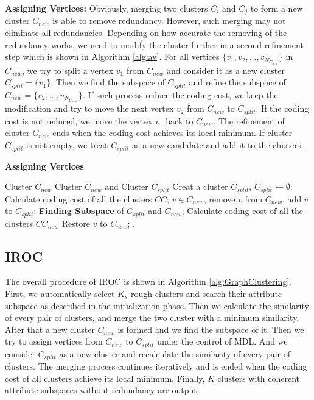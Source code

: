 \noindent \textbf{Assigning Vertices:} Obviously, merging two clusters $C_i$ and $C_j$ to form a new cluster $C_{new}$ is able to remove redundancy. However, such merging may not eliminate all redundancies. Depending on how accurate the removing of the redundancy works, we need to modify the cluster further in a second refinement step which is shown in Algorithm \ref{alg:av}. For all vertices $\{v_1,v_2,...,v_{N_{C_{new}}}\}$ in $C_{new}$, we try to split a vertex $v_1$ from $C_{new}$ and consider it as a new cluster $C_{split}=\{v_1\}$. Then we find the subspace of $C_{split}$ and refine the subspace of $C_{new}=\{v_2,...,v_{N_{C_{new}}}\}$. If such process reduce the coding cost, we keep the modification and try to move the next vertex $v_2$ from $C_{new}$ to $C_{split}$. If the coding cost is not reduced, we move the vertex $v_1$ back to $C_{new}$. The refinement of cluster $C_{new}$ ends when the coding cost achieves its local minimum. If cluster $C_{split}$ is not empty, we treat $C_{split}$ as a new candidate and add it to the clusters. 

\begin{algorithm}[htbp]
\caption{\textbf{Assigning Vertices}}
\label{alg:av}
\begin{algorithmic}[1]
\REQUIRE
    Cluster $C_{new}$
\ENSURE
    Cluster $C_{new}$ and Cluster $C_{split}$
\STATE Creat a cluster $C_{split}$, $C_{split} \leftarrow \emptyset$;
\STATE Calculate coding cost of all the clusters $CC$;
\STATE $v \in C_{new}$, remove $v$ from $C_{new}$, add $v$ to $C_{split}$;
\STATE \textbf{Finding Subspace} of $C_{split}$ and $C_{new}$;
\STATE Calculate coding cost of all the clusters $CC_{new}$
\STATE Restore $v$ to $C_{new}$;
\ENDIF
\ENDFOR
{}.
\end{algorithmic}
\end{algorithm}
 
\subsection{IROC}
\noindent The overall procedure of IROC is shown in Algorithm \ref{alg:GraphClustering}. First, we automatically select $K_s$ rough clusters and search their attribute subspace as described in the initialization phase. Then we calculate the similarity of every pair of clusters, and merge the two cluster with a minimum similarity. After that a new cluster $C_{new}$ is formed and we find the subspace of it. Then we try to assign vertices from $C_{new}$ to $C_{split}$ under the control of MDL. And we consider $C_{split}$ as a new cluster and recalculate the similarity of every pair of clusters. The merging process continues iteratively and is ended when the coding cost of all clusters achieve its local minimum. Finally, $K$ clusters with coherent attribute subspaces without redundancy are output.


